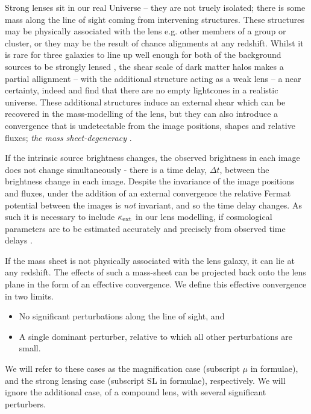 \documentclass[useAMS,usenatbib]{mn2e}
\begin{document}
Strong lenses sit in our real Universe -- they are not truely isolated;
there is some mass along the line of sight coming from intervening structures.
These structures may be physically associated with the lens e.g. other members
of a group or cluster, or they may be the result of chance alignments at any redshift. 
Whilst it is rare for three galaxies to line up well enough for both of the background sources
to be strongly lensed \citep{gavazzi2008,collett2012}, the shear scale of dark matter halos
makes a partial allignment -- with the additional structure acting as a weak lens -- 
a near certainty, indeed \citet{valewhite2003} and \citet{hilbert2007} find that there
are no empty lightcones in a realistic universe. These additional structures induce an external shear
which can be recovered in the mass-modelling of the lens, but they can also introduce a convergence that
is undetectable from the image positions, shapes and relative fluxes; {\it the mass sheet-degeneracy} \citep[see e.g.][for details]{Falco1985,Schneider2006}.


If the intrinsic source brightness changes, the observed brightness in each image does not change
simultaneously - there is a time delay, $\Delta t$, between the brightness change in
each image. Despite the invariance of the image positions and fluxes, under the addition
of an external convergence the relative Fermat potential between the images is {\it not}
invariant, and so the time delay changes. As such it is necessary to include $\kappa_{\rm ext}$
in our lens modelling, if cosmological parameters are to be estimated accurately and
precisely from observed time delays \citep{suyu2010}.

If the mass sheet is not physically associated with the lens galaxy, it can lie at any redshift. The effects of such a mass-sheet can be projected back onto the lens plane in the form of an effective convergence. We define this effective convergence in two limits.
\begin{itemize}
\item No significant perturbations along the line of sight, and \\
\item A single dominant perturber, relative to which all other perturbations are small.
\end{itemize}
We will refer to these cases as the magnification case (subscript $\mu$ in formulae), and the strong lensing case (subscript SL in formulae), respectively. We will ignore the additional case, of a compound lens, with several significant perturbers. 
\end{document}
